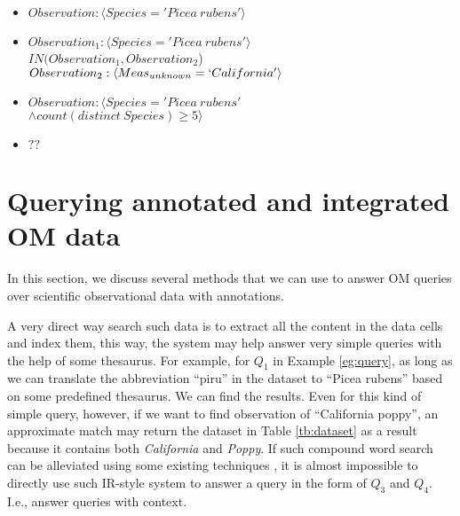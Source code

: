 \documentclass[conference]{IEEEtran}
\newtheorem{example}{Example}[section]
\newcommand{\from}[2]{{\bf[{\sc from #1:} #2]}}
\begin{document}
\begin{itemize}
\item $Observation: \langle Species='Picea~rubens'\rangle$
\item $Observation_1: \langle Species='Picea~rubens'\rangle$\\
  $IN(Observation_1, Observation_2$) \\
$Observation_2: \langle Meas_{unknown}=`California'\rangle$
\item $Observation: \langle Species='Picea~rubens' $\\
$\wedge
  count(distinct~Species)\geq 5\rangle$
\item $??$
\end{itemize}




\section{Querying annotated and integrated OM data}

In this section, we discuss several methods that we can use to
answer OM queries over scientific observational data with
annotations. 


A very direct way search such data is to extract all the content in
the data cells and index them, this way, the system may help answer
very simple queries with the help of some thesaurus. 
For example, for $Q_1$ in Example \ref{eg:query}, as long as we can
translate the abbreviation ``piru'' in the dataset to ``Picea rubens''
based on some predefined thesaurus. We can find the results. 
Even for this kind of simple query, however, if we want to find
observation of ``California poppy'', an approximate match may return
the dataset in Table \ref{tb:dataset} as a result because it contains
both {\em California} and {\em Poppy}.
If such compound word search can be alleviated using some existing
techniques \cite{***}, %
it is almost impossible to directly use such IR-style system to answer a query
in the form of $Q_3$ and $Q_4$. 
I.e., answer queries with context. 
\end{document}
